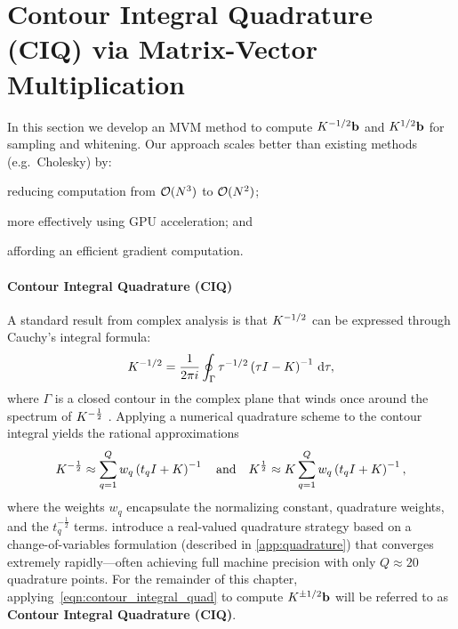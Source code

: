\section{Contour Integral Quadrature (CIQ) via Matrix-Vector Multiplication}
\label{sec:ciq_method}

In this section we develop an MVM method to compute $K^{-1/2} \mathbf{b}$ and $K^{1/2} \mathbf{b}$ for sampling and whitening.
Our approach scales better than existing methods (e.g.~Cholesky) by:
\begin{enumerate*}
  \item reducing computation from $\bigo{N^3}$ to $\bigo{N^2}$;
  \item more effectively using GPU acceleration; and
  \item affording an efficient gradient computation.
\end{enumerate*}

\paragraph{Contour Integral Quadrature (CIQ)}
A standard result from complex analysis is that $K^{-1/2}$ can be expressed through Cauchy's integral formula:
%
$$
	K^{-1 / 2} = \frac{1}{2 \pi i} \oint_\Gamma \tau^{- 1 / 2} \left( \tau I - K \right)^{-1} \,\mathrm{d}{\tau},
$$
%
where $\Gamma$ is a closed contour in the complex plane that winds once around the spectrum of $K^{-\frac 1 2}$ \citep{davies2005computing,hale2008computing,higham2008functions}.
Applying a numerical quadrature scheme to the contour integral yields the rational approximations
%
\begin{equation}
	K^{-\frac 1 2} \approx \sum_{q=1}^Q w_q \left( t_q I + K \right)^{-1}
  \quad \text{and} \quad
	K^{\frac 1 2} \approx K \sum_{q=1}^Q w_q \left( t_q I + K \right)^{-1},
	\label{eqn:contour_integral_quad}
\end{equation}
%
where the weights $w_q$ encapsulate the normalizing constant, quadrature weights, and the $t_q^{-\frac 1 2}$ terms.
\citet{hale2008computing} introduce a real-valued quadrature strategy based on a change-of-variables formulation (described in \cref{app:quadrature})
that converges extremely rapidly---often achieving full machine precision with only $Q \approx 20$ quadrature points.
For the remainder of this chapter, applying~\cref{eqn:contour_integral_quad} to compute $K^{\pm1/2} \mathbf{b}$  will be referred to as {\bf Contour Integral Quadrature (CIQ)}.



